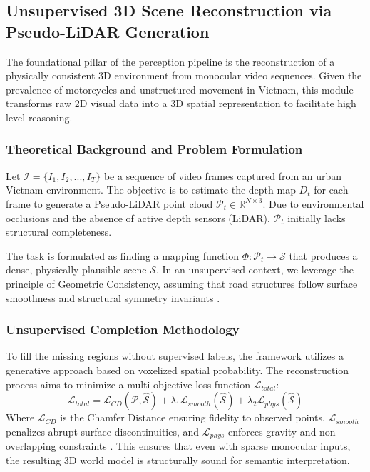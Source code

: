 \documentclass[a4paper, 12pt]{article}
\begin{document}
	
	\subsection{Unsupervised 3D Scene Reconstruction via Pseudo-LiDAR Generation}
	The foundational pillar of the perception pipeline is the reconstruction of a physically consistent 3D environment from monocular video sequences. Given the prevalence of motorcycles and unstructured movement in Vietnam, this module transforms raw 2D visual data into a 3D spatial representation to facilitate high level reasoning.
	
	\subsubsection{Theoretical Background and Problem Formulation}
	Let $\mathcal{I} = \{I_1, I_2, ..., I_T\}$ be a sequence of video frames captured from an urban Vietnam environment. The objective is to estimate the depth map $D_t$ for each frame to generate a Pseudo-LiDAR point cloud $\mathcal{P}_t \in \mathbb{R}^{N \times 3}$. Due to environmental occlusions and the absence of active depth sensors (LiDAR), $\mathcal{P}_t$ initially lacks structural completeness. 
	
	The task is formulated as finding a mapping function $\Phi: \mathcal{P}_t \rightarrow \mathcal{S}$ that produces a dense, physically plausible scene $\mathcal{S}$. In an unsupervised context, we leverage the principle of Geometric Consistency, assuming that road structures follow surface smoothness and structural symmetry invariants \cite{roadscene2vec2024, li2022spatio}.
	
	\subsubsection{Unsupervised Completion Methodology}
	To fill the missing regions without supervised labels, the framework utilizes a generative approach based on voxelized spatial probability. The reconstruction process aims to minimize a multi objective loss function $\mathcal{L}_{total}$:
	\begin{equation}
		\mathcal{L}_{total} = \mathcal{L}_{CD}(\mathcal{P}, \hat{\mathcal{S}}) + \lambda_1 \mathcal{L}_{smooth}(\hat{\mathcal{S}}) + \lambda_2 \mathcal{L}_{phys}(\hat{\mathcal{S}})
	\end{equation}
	Where $\mathcal{L}_{CD}$ is the Chamfer Distance ensuring fidelity to observed points, $\mathcal{L}_{smooth}$ penalizes abrupt surface discontinuities, and $\mathcal{L}_{phys}$ enforces gravity and non overlapping constraints \cite{ji2020action}. This ensures that even with sparse monocular inputs, the resulting 3D world model is structurally sound for semantic interpretation.
	
\end{document}
